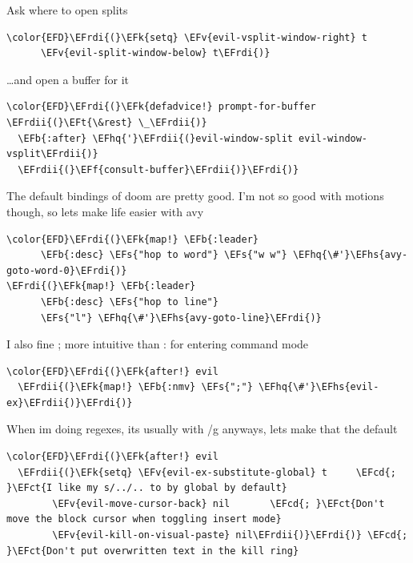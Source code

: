 \documentclass{scrartcl}
\newcommand{\EFk}[1]{\textcolor{EFk}{#1}} %
\newcommand{\EFt}[1]{\textcolor{EFt}{#1}} %
\newcommand{\EFs}[1]{\textcolor{EFs}{#1}} %
\newcommand{\EFb}[1]{\textcolor{EFb}{#1}} %
\newcommand{\EFct}[1]{\textcolor{EFct}{#1}} %
\newcommand{\EFv}[1]{\textcolor{EFv}{#1}} %
\newcommand{\EFf}[1]{\textcolor{EFf}{#1}} %
\newcommand{\EFcd}[1]{\textcolor{EFcd}{#1}} %
\newcommand{\EFhq}[1]{\textcolor{EFhq}{#1}} %
\newcommand{\EFhs}[1]{\textcolor{EFhs}{#1}} %
\newcommand{\EFrdi}[1]{\textcolor{EFrdi}{#1}} %
\newcommand{\EFrdii}[1]{\textcolor{EFrdii}{#1}} %
\begin{document}
Ask where to open splits
\begin{Code}
\begin{Verbatim}[]
\color{EFD}\EFrdi{(}\EFk{setq} \EFv{evil-vsplit-window-right} t
      \EFv{evil-split-window-below} t\EFrdi{)}
\end{Verbatim}
\end{Code}

\ldots{}and open a buffer for it
\begin{Code}
\begin{Verbatim}[]
\color{EFD}\EFrdi{(}\EFk{defadvice!} prompt-for-buffer \EFrdii{(}\EFt{\&rest} \_\EFrdii{)}
  \EFb{:after} \EFhq{'}\EFrdii{(}evil-window-split evil-window-vsplit\EFrdii{)}
  \EFrdii{(}\EFf{consult-buffer}\EFrdii{)}\EFrdi{)}
\end{Verbatim}
\end{Code}

The default bindings of doom are pretty good. I'm not so good with motions though, so lets make life easier with avy
\begin{Code}
\begin{Verbatim}[]
\color{EFD}\EFrdi{(}\EFk{map!} \EFb{:leader}
      \EFb{:desc} \EFs{"hop to word"} \EFs{"w w"} \EFhq{\#'}\EFhs{avy-goto-word-0}\EFrdi{)}
\EFrdi{(}\EFk{map!} \EFb{:leader}
      \EFb{:desc} \EFs{"hop to line"}
      \EFs{"l"} \EFhq{\#'}\EFhs{avy-goto-line}\EFrdi{)}
\end{Verbatim}
\end{Code}

I also fine ; more intuitive than : for entering command mode
\begin{Code}
\begin{Verbatim}[]
\color{EFD}\EFrdi{(}\EFk{after!} evil
  \EFrdii{(}\EFk{map!} \EFb{:nmv} \EFs{";"} \EFhq{\#'}\EFhs{evil-ex}\EFrdii{)}\EFrdi{)}
\end{Verbatim}
\end{Code}

When im doing regexes, its usually with /g anyways, lets make that the default
\begin{Code}
\begin{Verbatim}[]
\color{EFD}\EFrdi{(}\EFk{after!} evil
  \EFrdii{(}\EFk{setq} \EFv{evil-ex-substitute-global} t     \EFcd{; }\EFct{I like my s/../.. to by global by default}
        \EFv{evil-move-cursor-back} nil       \EFcd{; }\EFct{Don't move the block cursor when toggling insert mode}
        \EFv{evil-kill-on-visual-paste} nil\EFrdii{)}\EFrdi{)} \EFcd{; }\EFct{Don't put overwritten text in the kill ring}
\end{Verbatim}
\end{Code}
\end{document}
